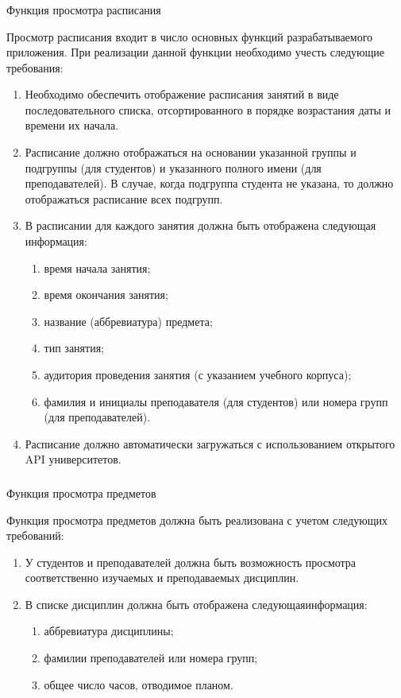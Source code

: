 \subsubsection{} Функция просмотра расписания
\label{sec:domain:specification:agenda}

Просмотр расписания входит в число основных функций разрабатываемого приложения. При реализации данной функции необходимо учесть следующие требования:

\begin{enumerate}
	\item Необходимо обеспечить отображение расписания занятий в виде последовательного списка, отсортированного в порядке возрастания даты и времени их начала.
	\item Расписание должно отображаться на основании указанной группы и подгруппы (для студентов) и указанного полного имени (для преподавателей). В случае, когда подгруппа студента не указана, то должно отображаться расписание всех подгрупп.
	\item В расписании для каждого занятия должна быть отображена следующая информация:
	\begin{enumerate}
		\item время начала занятия;
		\item время окончания занятия;
		\item название (аббревиатура) предмета;
		\item тип занятия;
		\item аудитория проведения занятия (с указанием учебного корпуса);
		\item фамилия и инициалы преподавателя (для студентов) или номера групп (для преподавателей).
	\end{enumerate}
	\item Расписание должно автоматически загружаться с использованием открытого API университетов.
\end{enumerate}

\subsubsection{} Функция просмотра предметов
\label{sec:domain:specification:subjects}

Функция просмотра предметов должна быть реализована с учетом следующих требований:

\begin{enumerate}
	\item У студентов и преподавателей должна быть возможность просмотра соответственно изучаемых и преподаваемых дисциплин.
	\item В списке дисциплин должна быть отображена следующая\linebreak информация:
	\begin{enumerate}
		\item аббревиатура дисциплины;
		\item фамилии преподавателей или номера групп;
		\item общее число часов, отводимое планом.
	\end{enumerate}
\end{enumerate}

